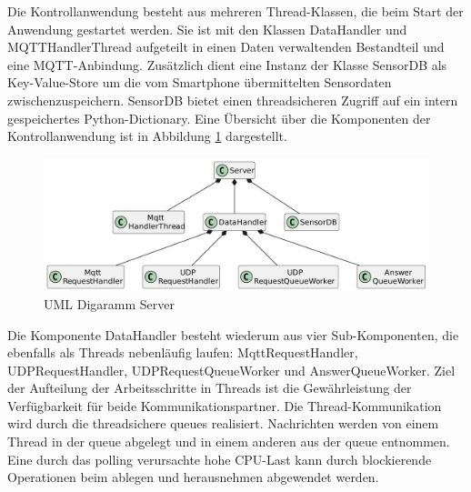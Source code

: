 \documentclass[11pt,a4paper]{report}
\begin{document}
Die Kontrollanwendung besteht aus mehreren Thread-Klassen, die beim Start der Anwendung gestartet werden.
Sie ist mit den Klassen DataHandler und MQTTHandlerThread aufgeteilt in einen Daten verwaltenden Bestandteil und eine MQTT-Anbindung.
Zusätzlich dient eine Instanz der Klasse SensorDB als Key-Value-Store um die vom Smartphone übermittelten Sensordaten zwischenzuspeichern.
SensorDB bietet einen threadsicheren Zugriff auf ein intern gespeichertes Python-Dictionary.
Eine Übersicht über die Komponenten der Kontrollanwendung ist in Abbildung \ref{fig:serverUml} dargestellt.
\begin{figure}[htbp]
  \centering
  \includegraphics[width=\textwidth]{images/ServerUml}
  \caption{UML Digaramm Server}
  \label{fig:serverUml}
\end{figure}

Die Komponente DataHandler besteht wiederum aus vier Sub-Komponenten, die ebenfalls als Threads nebenläufig laufen: MqttRequestHandler, UDPRequestHandler, UDPRequestQueueWorker und AnswerQueueWorker.
Ziel der Aufteilung der Arbeitsschritte in Threads ist die Gewährleistung der Verfügbarkeit für beide Kommunikationspartner.
Die Thread-Kommunikation wird durch die threadsichere queues \cite{python_queue} realisiert.
Nachrichten werden von einem Thread in der queue abgelegt und in einem anderen aus der queue entnommen.
Eine durch das polling verursachte hohe CPU-Last kann durch blockierende Operationen beim ablegen und herausnehmen abgewendet werden.
\end{document}

